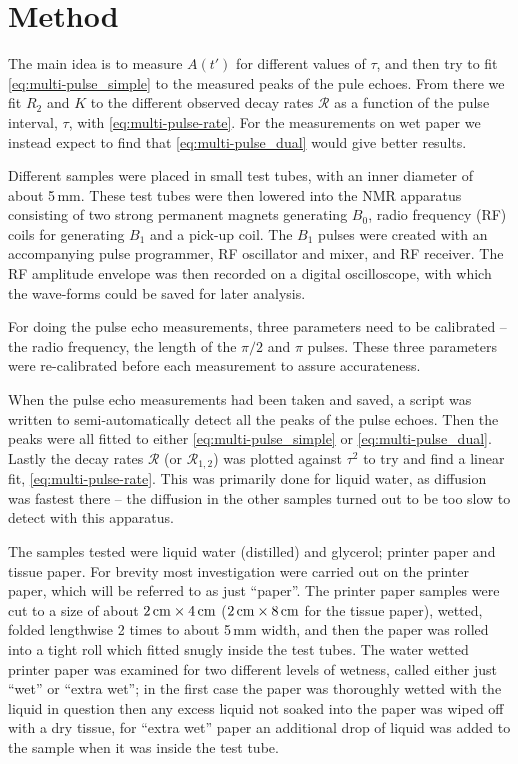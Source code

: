 \documentclass[11pt,a4paper, twocolumn,
swedish, english %
]{article}
\begin{document}
\section{Method} \label{sec:met}
The main idea is to measure $A(t')$ for different values of $\tau$,
and then try to fit \eqref{eq:multi-pulse_simple} to the measured
peaks of the pule echoes. From there we fit $R_2$ and $K$ to the
different observed decay rates $\mathcal{R}$ as a function of the
pulse interval, $\tau$, with \eqref{eq:multi-pulse-rate}. For the
measurements on wet paper we instead expect to find that
\eqref{eq:multi-pulse_dual} would give better results.

Different samples were placed in small test tubes, with an inner
diameter of about 5\,mm. These test tubes were then lowered into the
NMR apparatus consisting of two strong permanent magnets generating
$B_0$, radio frequency (RF) coils for generating $B_1$ and a pick-up
coil. The $B_1$ pulses were created with an accompanying pulse
programmer, RF oscillator and mixer, and RF receiver. The RF amplitude
envelope was then recorded on a digital oscilloscope, with which the
wave-forms could be saved for later analysis. 

For doing the pulse echo measurements, three parameters need to be
calibrated -- the radio frequency, the length of the $\pi/2$ and $\pi$
pulses. These three parameters were re-calibrated before each
measurement to assure accurateness.

When the pulse echo measurements had been taken and saved, a script
was written to semi-automatically detect all the peaks
of the pulse echoes. Then the peaks were all fitted to either
\eqref{eq:multi-pulse_simple} or \eqref{eq:multi-pulse_dual}.
Lastly the decay rates $\mathcal{R}$ (or $\mathcal{R}_{1, 2}$) was
plotted against $\tau^2$ to try and find a linear fit,
\eqref{eq:multi-pulse-rate}.\footnotemark{} 
This was primarily done for liquid water, as diffusion was fastest
there -- the diffusion in the other samples turned out to be too slow
to detect with this apparatus. 


The samples tested were liquid water (distilled) and glycerol; 
printer paper and tissue paper. For brevity most investigation were
carried out on the printer paper, which will be referred to as just
``paper''. The printer paper samples were cut to a size of about  
$\unit[2]{cm}\times\unit[4]{cm}$ ($\unit[2]{cm}\times\unit[8]{cm}$ for
the tissue paper), wetted, folded lengthwise 2 times to about 5\,mm
width, and then the paper was rolled into a tight roll which fitted
snugly inside the test tubes.
The water wetted printer paper was examined for two different levels of
wetness, called either just ``wet'' or ``extra wet''; in the first
case the paper was thoroughly wetted with the liquid in question then
any excess liquid not soaked into the paper was wiped off with a dry
tissue, for ``extra wet'' paper an additional drop of liquid was added
to the sample when it was inside the test tube. 
\end{document}
